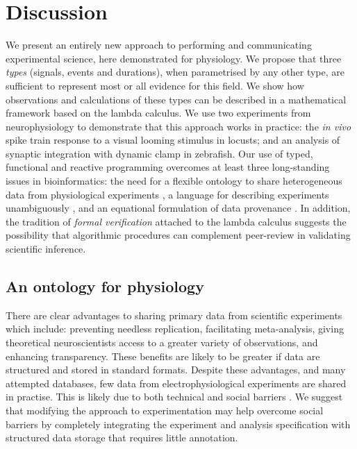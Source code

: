\section*{Discussion}

We present an entirely new approach to performing and communicating
experimental science, here demonstrated for physiology. We propose
that three \emph{types} (signals, events and durations), when
parametrised by any other type, are sufficient to represent most or
all evidence for this field. We show how observations and calculations
of these types can be described in a mathematical framework based on
the lambda calculus. We use two experiments from neurophysiology to
demonstrate that this approach works in practice: the \emph{in vivo}
spike train response to a visual looming stimulus in locusts; and an
analysis of synaptic integration with dynamic clamp in zebrafish. Our use
of typed, functional and reactive programming overcomes at least three
long-standing issues in bioinformatics: the need for a flexible
ontology to share heterogeneous data from physiological experiments
\citep{Amari2002}, a language for describing experiments unambiguously
\citep{Murray-Rust2002}, and an equational formulation of data
provenance \citep{Pool2002}. In addition, the tradition of
\emph{formal verification} attached to the lambda calculus suggests
the possibility that algorithmic procedures can complement peer-review
in validating scientific inference.

\subsection*{An ontology for physiology}

There are clear advantages to sharing primary data from scientific
experiments \citep{Insel2003} which include: preventing needless replication,
facilitating meta-analysis, giving theoretical neuroscientists access
to a greater variety of observations, and enhancing transparency. These
benefits are likely to be greater if data are structured and stored in
standard formats. Despite these advantages, and many attempted
databases, few data from electrophysiological experiments are
shared in practise. This is likely due to both technical and social
barriers \citep{Amari2002}. We suggest that modifying the approach to
experimentation may help overcome social barriers by completely
integrating the experiment and analysis specification with structured
data storage that requires little annotation.

